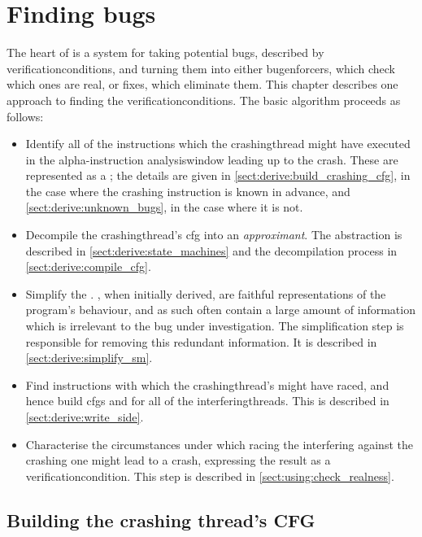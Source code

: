 \chapter{Finding bugs}
\label{sect:derive}

The heart of {\technique} is a system for taking potential bugs,
described by \glspl{verificationcondition}, and turning them into
either \glspl{bugenforcer}, which check which ones are real, or fixes,
which eliminate them.  This chapter describes one approach to finding
the \glspl{verificationcondition}.  The basic algorithm proceeds as
follows:
\begin{itemize}
\item Identify all of the instructions which the \gls{crashingthread}
  might have executed in the \gls{alpha}-instruction
  \gls{analysiswindow} leading up to the crash.  These are represented
  as a ; the
  details are given in \autoref{sect:derive:build_crashing_cfg}, in
  the case where the crashing instruction is known in advance, and
  \autoref{sect:derive:unknown_bugs}, in the case where it is not.
\item Decompile the \gls{crashingthread}'s \gls{cfg} into an
  \emph{approximant}.  The {\StateMachine} abstraction is described in
  \autoref{sect:derive:state_machines} and the decompilation process
  in \autoref{sect:derive:compile_cfg}.
\item Simplify the {\StateMachine}.  {\STateMachines}, when initially
  derived, are faithful representations of the program's behaviour,
  and as such often contain a large amount of information which is
  irrelevant to the bug under investigation.  The simplification step
  is responsible for removing this redundant information.  It is
  described in \autoref{sect:derive:simplify_sm}.
\item Find instructions with which the \gls{crashingthread}'s
  {\StateMachine} might have raced, and hence build \glspl{cfg} and
  {\StateMachines} for all of the \glspl{interferingthread}.  This is
  described in \autoref{sect:derive:write_side}.
\item Characterise the circumstances under which racing the
  interfering {\StateMachines} against the crashing one might lead to
  a crash, expressing the result as a \gls{verificationcondition}.
  This step is described in \autoref{sect:using:check_realness}.
\end{itemize}

\section{Building the crashing thread's CFG}
\label{sect:derive:build_crashing_cfg}

